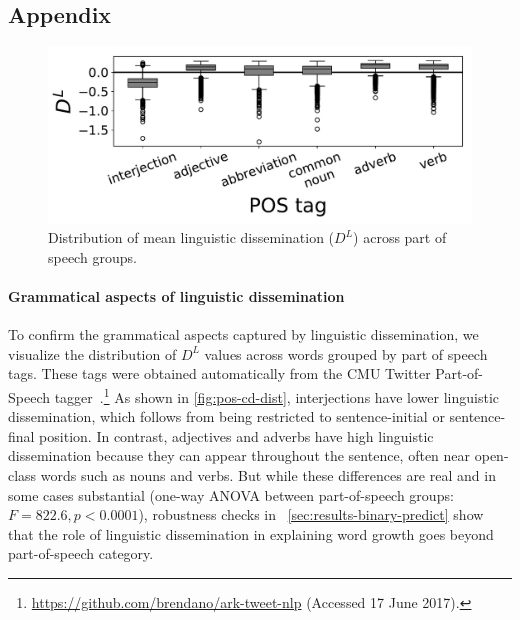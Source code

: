 \begin{appendices}

\section*{Appendix}
\label{sec:appendix}

\begin{figure}[t!]
\centering
\includegraphics[width=\columnwidth]{figures/pos_DL_distribution.pdf}
\caption{Distribution of mean linguistic dissemination ($D^{L}$) across part of speech groups.}
\label{fig:pos-cd-dist}
\end{figure}

\paragraph{Grammatical aspects of linguistic dissemination}

To confirm the grammatical aspects captured by linguistic dissemination, we visualize the distribution of $D^{L}$ values across words grouped by part of speech tags.
These tags were obtained automatically from the CMU Twitter Part-of-Speech tagger~\cite{gimpel2011}.\footnote{\url{https://github.com/brendano/ark-tweet-nlp} (Accessed 17 June 2017).}
As shown in \autoref{fig:pos-cd-dist}, interjections have lower linguistic dissemination, which follows from being restricted to sentence-initial or sentence-final position. 
In contrast, adjectives and adverbs have high linguistic dissemination because they can appear throughout the sentence, often near open-class words such as nouns and verbs. 
But while these differences are real and in some cases substantial (one-way ANOVA between part-of-speech groups: $F=822.6, p < 0.0001$), robustness checks in ~\autoref{sec:results-binary-predict} show that the role of linguistic dissemination in explaining word growth goes beyond part-of-speech category.


\end{appendices}
